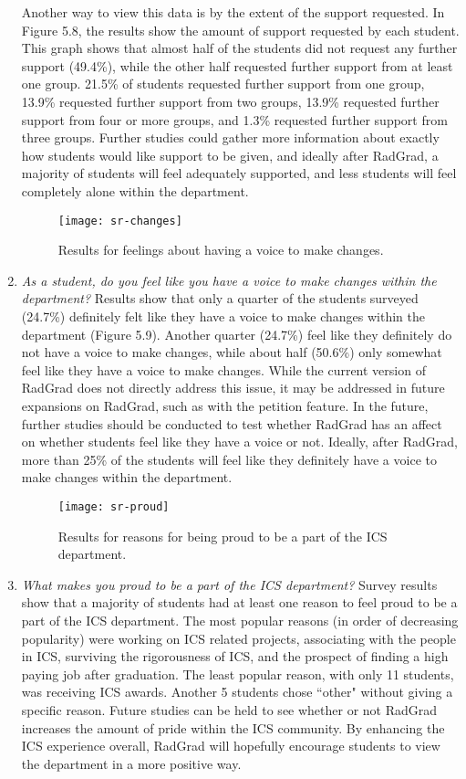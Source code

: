\begin{enumerate}
Another way to view this data is by the extent of the support requested. In Figure 5.8, the results show the amount of support requested by each student. This graph shows that almost half of the students did not request any further support (49.4\%), while the other half requested further support from at least one group. 21.5\% of students requested further support from one group, 13.9\% requested further support from two groups, 13.9\% requested further support from four or more groups, and 1.3\% requested further support from three groups. Further studies could gather more information about exactly how students would like support to be given, and ideally after RadGrad, a majority of students will feel adequately supported, and less students will feel completely alone within the department. 
\begin{figure}[h]
\centering
\texttt{[image: sr-changes]}
\caption{Results for feelings about having a voice to make changes.}
\end{figure}
\item \textit{As a student, do you feel like you have a voice to make changes within the department?}
Results show that only a quarter of the students surveyed (24.7\%) definitely felt like they have a voice to make changes within the department (Figure 5.9). Another quarter (24.7\%) feel like they definitely do not have a voice to make changes, while about half (50.6\%) only somewhat feel like they have a voice to make changes. While the current version of RadGrad does not directly address this issue, it may be addressed in future expansions on RadGrad, such as with the petition feature. In the future, further studies should be conducted to test whether RadGrad has an affect on whether students feel like they have a voice or not. Ideally, after RadGrad, more than 25\% of the students will feel like they definitely have a voice to make changes within the department.
\begin{figure}[h]
\centering
\texttt{[image: sr-proud]}
\caption{Results for reasons for being proud to be a part of the ICS department.}
\end{figure}
\item \textit{What makes you proud to be a part of the ICS department?}
Survey results show that a majority of students had at least one reason to feel proud to be a part of the ICS department. The most popular reasons (in order of decreasing popularity) were working on ICS related projects, associating with the people in ICS, surviving the rigorousness of ICS, and the prospect of finding a high paying job after graduation. The least popular reason, with only 11 students, was receiving ICS awards. Another 5 students chose ``other" without giving a specific reason. Future studies can be held to see whether or not RadGrad increases the amount of pride within the ICS community. By enhancing the ICS experience overall, RadGrad will hopefully encourage students to view the department in a more positive way. 
\end{enumerate}

